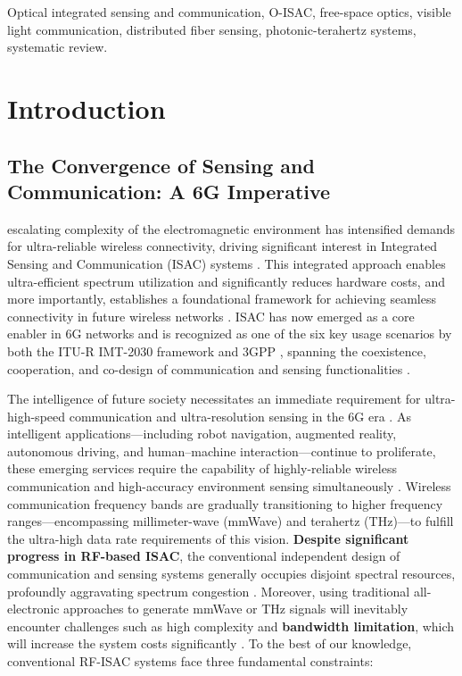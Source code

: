 \documentclass[lettersize,journal]{IEEEtran}
\begin{document}
\begin{IEEEkeywords}
Optical integrated sensing and communication, O-ISAC, free-space optics, visible light communication, distributed fiber sensing, photonic-terahertz systems, systematic review.
\end{IEEEkeywords}

\section{Introduction}
\label{introduction}
\subsection{The Convergence of Sensing and Communication: A 6G Imperative}
 escalating complexity of the electromagnetic environment has intensified demands for ultra-reliable wireless connectivity, driving significant interest in Integrated Sensing and Communication (ISAC) systems \cite{O_ISAC_070}. This integrated approach enables ultra-efficient spectrum utilization and significantly reduces hardware costs, and more importantly, establishes a foundational framework for achieving seamless connectivity in future wireless networks \cite{O_ISAC_070}. ISAC has now emerged as a core enabler in 6G networks and is recognized as one of the six key usage scenarios by both the ITU-R IMT-2030 framework \cite{O_ISAC_162} and 3GPP \cite{O_ISAC_162}, spanning the coexistence, cooperation, and co-design of communication and sensing functionalities \cite{O_ISAC_070}.

The intelligence of future society necessitates an immediate requirement for ultra-high-speed communication and ultra-resolution sensing in the 6G era \cite{O_ISAC_016}. As intelligent applications---including robot navigation, augmented reality, autonomous driving, and human--machine interaction---continue to proliferate, these emerging services require the capability of highly-reliable wireless communication and high-accuracy environment sensing simultaneously \cite{O_ISAC_351}. Wireless communication frequency bands are gradually transitioning to higher frequency ranges---encompassing millimeter-wave (mmWave) and terahertz (THz)---to fulfill the ultra-high data rate requirements of this vision. \textbf{Despite significant progress in RF-based ISAC}, the conventional independent design of communication and sensing systems generally occupies disjoint spectral resources, profoundly aggravating spectrum congestion \cite{O_ISAC_351}. Moreover, using traditional all-electronic approaches to generate mmWave or THz signals will inevitably encounter challenges such as high complexity and \textbf{bandwidth limitation}, which will increase the system costs significantly \cite{O_ISAC_286}. To the best of our knowledge, conventional RF-ISAC systems face three fundamental constraints:
\end{document}
